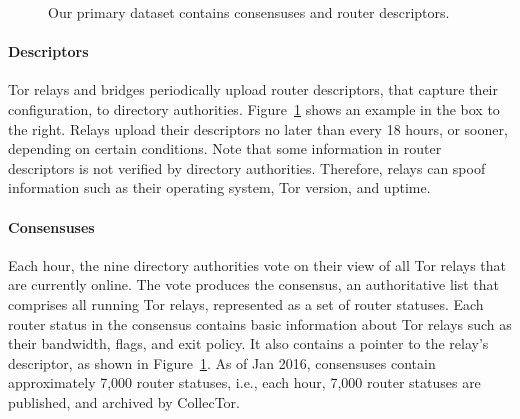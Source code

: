 \begin{figure}[t]
\caption{Our primary dataset contains consensuses and router descriptors.}
\label{fig:datasets}
\end{figure}

\paragraph{Descriptors} Tor relays and bridges periodically upload router
descriptors, that capture their configuration, to directory authorities.
Figure~\ref{fig:datasets} shows an example in the box to the right.  Relays
upload their descriptors no later than every 18 hours, or sooner, depending on
certain conditions.  Note that some information in router descriptors is not
verified by directory authorities.  Therefore, relays can spoof information such
as their operating system, Tor version, and uptime.

\paragraph{Consensuses} Each hour, the nine directory authorities vote on their
view of all Tor relays that are currently online.  The vote produces the
consensus, an authoritative list that comprises all running Tor relays,
represented as a set of router statuses.  Each router status in the consensus
contains basic information about Tor relays such as their bandwidth, flags, and
exit policy.  It also contains a pointer to the relay's descriptor, as shown in
Figure~\ref{fig:datasets}.  As of Jan 2016, consensuses contain approximately
7,000 router statuses, i.e., each hour, 7,000 router statuses are published, and
archived by CollecTor.

